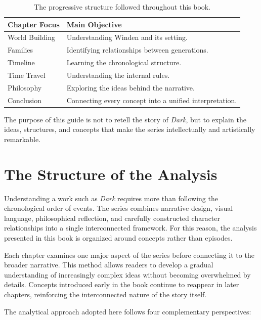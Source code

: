 \documentclass[12pt,oneside,openany]{book}
\begin{document}
\begin{table}[H]
\centering
\begin{tabular}{|p{4cm}|p{8cm}|}
\hline
\textbf{Chapter Focus} & \textbf{Main Objective} \\
\hline
World Building & Understanding Winden and its setting. \\
\hline
Families & Identifying relationships between generations. \\
\hline
Timeline & Learning the chronological structure. \\
\hline
Time Travel & Understanding the internal rules. \\
\hline
Philosophy & Exploring the ideas behind the narrative. \\
\hline
Conclusion & Connecting every concept into a unified interpretation. \\
\hline
\end{tabular}
\caption{The progressive structure followed throughout this book.}
\end{table}

\begin{tcolorbox}[colback=gray!8,colframe=black,title=Key Takeaway]
The purpose of this guide is not to retell the story of \textit{Dark}, but to explain the ideas, structures, and concepts that make the series intellectually and artistically remarkable.
\end{tcolorbox}
\section{The Structure of the Analysis}

Understanding a work such as \textit{Dark} requires more than following the chronological order of events. The series combines narrative design, visual language, philosophical reflection, and carefully constructed character relationships into a single interconnected framework. For this reason, the analysis presented in this book is organized around concepts rather than episodes.

Each chapter examines one major aspect of the series before connecting it to the broader narrative. This method allows readers to develop a gradual understanding of increasingly complex ideas without becoming overwhelmed by details. Concepts introduced early in the book continue to reappear in later chapters, reinforcing the interconnected nature of the story itself.

The analytical approach adopted here follows four complementary perspectives:
\end{document}
